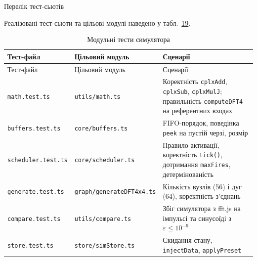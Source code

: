 Перелік тест-сьютів

Реалізовані тест-сьюти та цільові модулі наведено у
табл.~\hyperref[tab:tests]{19}.

\begin{longtable}[]{@{}
  >{\raggedright\arraybackslash}p{}
  >{\raggedright\arraybackslash}p{}
  >{\raggedright\arraybackslash}p{}@{}}
\caption{\protect{}\label{tab:tests}{}Модульні тести
симулятора}\tabularnewline
\toprule\noalign{}
\begin{minipage}[b]{\linewidth}\raggedright
Тест-файл
\end{minipage} & \begin{minipage}[b]{\linewidth}\raggedright
Цільовий модуль
\end{minipage} & \begin{minipage}[b]{\linewidth}\raggedright
Сценарії
\end{minipage} \\
\midrule\noalign{}
\endfirsthead
\toprule\noalign{}
\begin{minipage}[b]{\linewidth}\raggedright
Тест-файл
\end{minipage} & \begin{minipage}[b]{\linewidth}\raggedright
Цільовий модуль
\end{minipage} & \begin{minipage}[b]{\linewidth}\raggedright
Сценарії
\end{minipage} \\
\midrule\noalign{}
\endhead
\bottomrule\noalign{}
\endlastfoot
\texttt{math.test.ts} & \texttt{utils/math.ts} & Коректність
\texttt{cplxAdd}, \texttt{cplxSub}, \texttt{cplxMulJ}; правильність
\texttt{computeDFT4} на референтних входах \\
\texttt{buffers.test.ts} & \texttt{core/buffers.ts} & FIFO-порядок,
поведінка \texttt{peek} на пустій черзі, розмір \\
\texttt{scheduler.test.ts} & \texttt{core/scheduler.ts} & Правило
активації, коректність \texttt{tick()}, дотримання \texttt{maxFires},
детермінованість \\
\texttt{generate.test.ts} & \texttt{graph/generateDFT4x4.ts} & Кількість
вузлів (56) і дуг (64), коректність з'єднань \\
\texttt{compare.test.ts} & \texttt{utils/compare.ts} & Збіг симулятора з
fft.js на імпульсі та синусоїді з \(\varepsilon \leq 10^{- 9}\) \\
\texttt{store.test.ts} & \texttt{store/simStore.ts} & Скидання стану,
\texttt{injectData}, \texttt{applyPreset} \\
\end{longtable}


